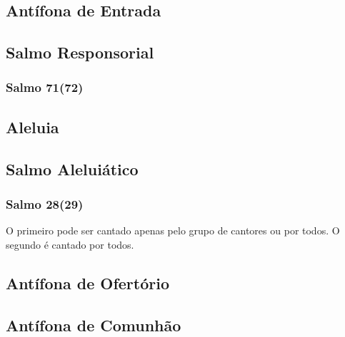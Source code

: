 \subsection{Antífona de Entrada}\label{subsection:tempus-per-annum/domini-nostri-iesu-christi-universorum-regis/introitus}

\AllowPageFlush

\subsection[Salmo Responsorial]{Salmo Responsorial}\label{subsection:tempus-nativitatis/in-epiphania-domini/psalmus-responsorius}
\subsubsection{Salmo 71(72)}

\AllowPageFlush

\subsection{Aleluia}\label{subsection:tempus-nativitatis/in-epiphania-domini/alleluia}

\AllowPageFlush

\subsection[Salmo Aleluiático]{Salmo Aleluiático}\label{subsection:tempus-nativitatis/in-epiphania-domini/psalmus-alleluiaticus}
\subsubsection{Salmo 28(29)}
\begin{rubrica}
  O primeiro {\normalfont\Rbar} pode ser cantado apenas pelo grupo de cantores ou por todos. O segundo {\normalfont\Rbar} é cantado por todos.
\end{rubrica}

\AllowPageFlush

\subsection{Antífona de Ofertório}\label{subsection:tempus-per-annum/domini-nostri-iesu-christi-universorum-regis/offertorium}

\AllowPageFlush

\subsection{Antífona de Comunhão}\label{subsection:tempus-per-annum/domini-nostri-iesu-christi-universorum-regis/communio}
